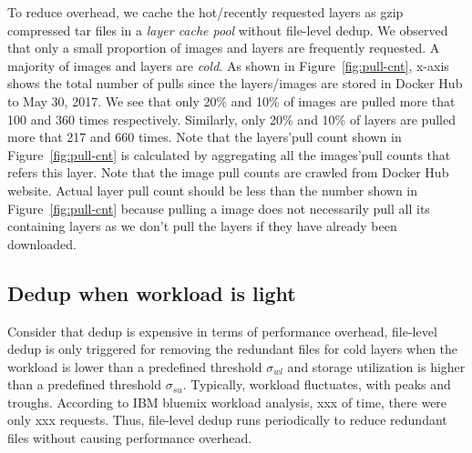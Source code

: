 %
To reduce overhead, we cache the hot/recently requested layers as gzip compressed tar files in a \textit{layer cache pool} without file-level dedup.
We observed that only a small proportion of images and layers are frequently requested. A majority of images and layers are \textit{cold}.
%
%
As shown in Figure~\ref{fig:pull-cnt}, x-axis shows the total number of pulls since the layers/images are stored in Docker Hub to May 30, 2017. 
We see that only 20\% and 10\% of images are pulled more that 100 and 360 times respectively. 
Similarly, only 20\% and 10\% of layers are pulled more that 217 and 660 times. 
Note that 
the layers'pull count shown in Figure~\ref{fig:pull-cnt} is calculated by aggregating all the images'pull counts that refers this layer.
Note that the image pull counts are crawled from Docker Hub website.
Actual layer pull count should be less than the number shown in Figure~\ref{fig:pull-cnt} because pulling a image does not necessarily pull all its containing layers as we don't pull the layers if they have already been downloaded.
%

%
 
\subsection{Dedup when workload is light}Consider that dedup is expensive in terms of performance overhead, file-level dedup is only triggered for removing the redundant files for cold layers when the workload is lower than a predefined threshold $\sigma_{wl}$ and storage utilization is higher than a predefined threshold $\sigma_{su}$. 
Typically, workload fluctuates, with peaks and troughs. According to IBM bluemix workload analysis\cite{xxx}, xxx of time, there were only xxx requests. %
Thus, file-level dedup runs periodically to reduce redundant files without causing performance overhead. 
%
%

